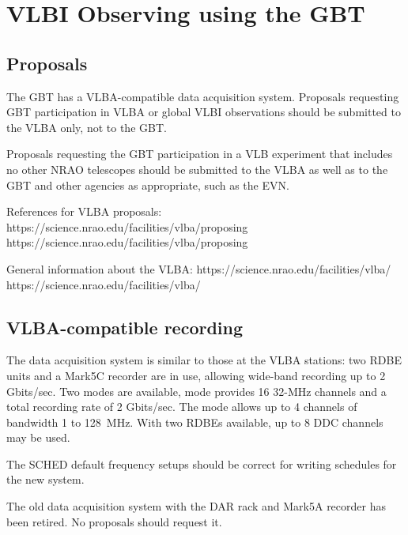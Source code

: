 \chapter{VLBI Observing using the GBT}\label{chap:vlba}

\section{Proposals}
The \gls{GBT} has a \gls{VLBA}-compatible data acquisition system.  
Proposals requesting \gls{GBT} participation in \gls{VLBA} or global \gls{VLBI} 
observations should be submitted to the \gls{VLBA} only, not to the \gls{GBT}.

Proposals requesting the \gls{GBT} participation in a \gls{VLB} experiment that
includes no other \gls{NRAO} telescopes should be submitted to the
\gls{VLBA} as well as to the \gls{GBT} and other agencies as appropriate, such
as the \gls{EVN}.

References for \gls{VLBA} proposals: \htmladdnormallink
{https://science.nrao.edu/facilities/vlba/proposing}
{https://science.nrao.edu/facilities/vlba/proposing}

General information about the VLBA: \htmladdnormallink
{https://science.nrao.edu/facilities/vlba/}
{https://science.nrao.edu/facilities/vlba/}

\section{VLBA-compatible recording}
The data acquisition system is similar to those at the \gls{VLBA} stations:
two \gls{RDBE} units and a Mark5C recorder are in use, allowing wide-band recording
up to 2 Gbits/sec. Two modes are available,  mode provides 16 32-MHz
channels and a total  recording rate of 2 Gbits/sec.  The  mode allows up
to 4 channels of bandwidth 1 to 128~MHz. With two \glspl{RDBE} available, up to
8 \gls{DDC} channels may be used.

 The SCHED default frequency setups should be correct for writing schedules
for the new system.

The old data acquisition system with the DAR rack and Mark5A recorder has been 
retired.  No proposals should request it.

\newpage

